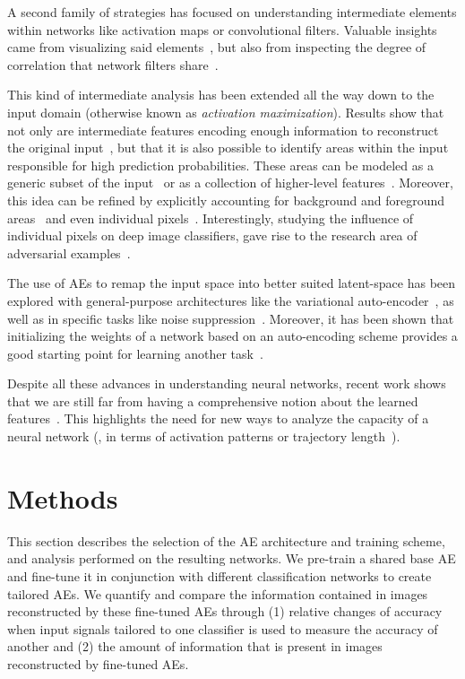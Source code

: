\documentclass[10pt,twocolumn,a4paper]{article}
\begin{document}
A second family of strategies has focused on understanding intermediate elements within networks like activation maps or convolutional filters.
Valuable insights came from visualizing said elements~\cite{zeiler2014visualizing}, but also from inspecting the degree of correlation that network filters share~\cite{li2015convergent}.

This kind of intermediate analysis has been extended all the way down to the input domain (otherwise known as \emph{activation maximization}).
Results show that not only are intermediate features encoding enough information to reconstruct the original input~\cite{mahendran2015understanding, dosovitskiy2016inverting}, but that it is also possible to identify areas within the input responsible for high prediction probabilities.
These areas can be modeled as a generic subset of the input~\cite{zhou2016learning, nguyen2016synthesizing} or as a collection of higher-level features~\cite{long2014convnets, netdissect2017}.
Moreover, this idea can be refined by explicitly accounting for background and foreground areas~\cite{simonyan2013deep} and even individual pixels~\cite{montavon2017explaining}.
Interestingly, studying the influence of individual pixels on deep image classifiers, gave rise to the research area of adversarial examples~\cite{szegedy2013intriguing}.

The use of AEs to remap the input space into better suited latent-space has been explored with general-purpose architectures like the variational auto-encoder~\cite{kingma2013auto}, as well as in specific tasks like noise suppression~\cite{vincent2010stacked}.
Moreover, it has been shown that initializing the weights of a network based on an auto-encoding scheme provides a good starting point for learning another task~\cite{masci2011stacked}.

Despite all these advances in understanding neural networks, recent work shows that we are still far from having a comprehensive notion about the learned features~\cite{zhang2016understanding}.
This highlights the need for new ways to analyze the capacity of a neural network (\eg, in terms of activation patterns or trajectory length~\cite{raghu2016expressive}).



\section{Methods}
This section describes the selection of the AE architecture and training scheme, and analysis performed on the resulting networks.
We pre-train a shared base AE and fine-tune it in conjunction with different classification networks to create tailored AEs.
We quantify and compare the information contained in images reconstructed by these fine-tuned AEs through
(1) relative changes of accuracy when input signals tailored to one classifier is used to measure the accuracy of another and (2) the amount of information that is present in images reconstructed by fine-tuned AEs.
\end{document}
